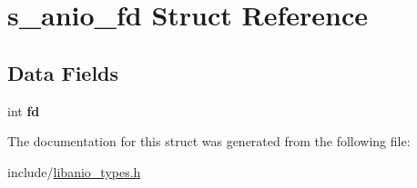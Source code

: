 \hypertarget{structs__anio__fd}{}\section{s\+\_\+anio\+\_\+fd Struct Reference}
\label{structs__anio__fd}
\subsection*{Data Fields}
\begin{DoxyCompactItemize}
\item 
\hypertarget{structs__anio__fd_a197fedd1e8a99911019c5123a969ada7}{}int {\bfseries fd}\label{structs__anio__fd_a197fedd1e8a99911019c5123a969ada7}

\end{DoxyCompactItemize}


The documentation for this struct was generated from the following file\+:\begin{DoxyCompactItemize}
\item 
include/\hyperlink{libanio__types_8h}{libanio\+\_\+types.\+h}\end{DoxyCompactItemize}
